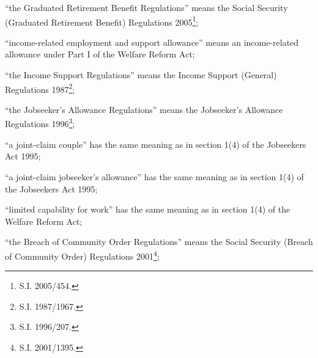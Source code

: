 \documentclass[12pt,a4paper]{article}
\begin{document}
\begin{enumerate}

“the Graduated Retirement Benefit Regulations” means the Social Security (Graduated Retirement Benefit) Regulations 2005\footnote{S.I. 2005/454.};

“income-related employment and support allowance” means an income-related allowance under Part I of the Welfare Reform Act;

“the Income Support Regulations” means the Income Support (General) Regulations 1987\footnote{\frenchspacing S.I. 1987/1967.};

“the Jobseeker’s Allowance Regulations” means the Jobseeker’s Allowance Regulations 1996\footnote{\frenchspacing S.I. 1996/207.};

“a joint-claim couple” has the same meaning as in section 1(4) of the Jobseekers Act 1995;

    “a joint-claim jobseeker’s allowance” has the same meaning as in section 1(4) of the Jobseekers Act 1995;


“limited capability for work” has the same meaning as in section 1(4) of the Welfare Reform Act;

“the Breach of Community Order Regulations” means the Social Security (Breach of Community Order) Regulations 2001\footnote{S.I. 2001/1395.};



\end{enumerate}
\end{document}

